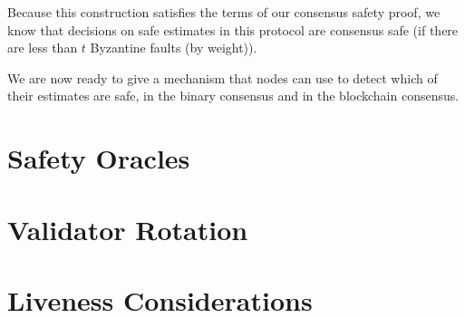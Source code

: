 \documentclass{article}
\theoremstyle{definition}
\begin{document}
Because this construction satisfies the terms of our consensus safety proof, we know that decisions on safe estimates in this protocol are consensus safe (if there are less than $t$ Byzantine faults (by weight)). 

We are now ready to give a mechanism that nodes can use to detect which of their estimates are safe, in the binary consensus and in the blockchain consensus.
\section{Safety Oracles}

\section{Validator Rotation}

\section{Liveness Considerations}
\end{document}
